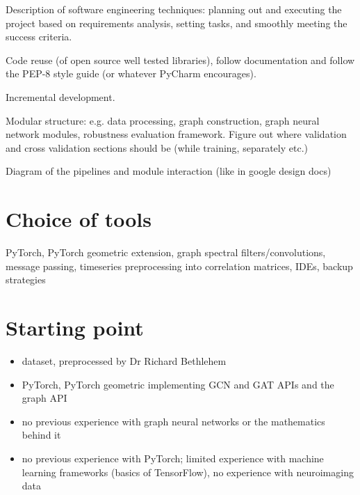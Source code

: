 Description of software engineering techniques: planning out and executing the project based on requirements analysis, setting tasks, and smoothly meeting the success criteria.

Code reuse (of open source well tested libraries), follow documentation and follow the PEP-8 style guide (or whatever PyCharm encourages).

Incremental development.

Modular structure: e.g. data processing, graph construction, graph neural network modules, robustness evaluation framework. Figure out where validation and cross validation sections should be (while training, separately etc.)

Diagram of the pipelines and module interaction (like in google design docs)


\section{Choice of tools}
PyTorch, PyTorch geometric extension, graph spectral filters/convolutions, message passing, timeseries preprocessing into correlation matrices, IDEs, backup strategies

\section{Starting point}
\begin{itemize}
    \item dataset, preprocessed by Dr Richard Bethlehem
    \item PyTorch, PyTorch geometric implementing GCN and GAT APIs and the graph API
    \item no previous experience with graph neural networks or the mathematics behind it
    \item no previous experience with PyTorch; limited experience with machine learning frameworks (basics of TensorFlow), no experience with neuroimaging data
\end{itemize}
